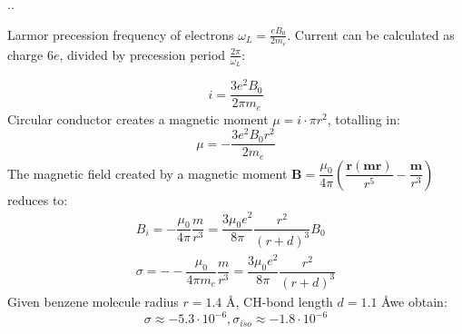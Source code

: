 \documentclass{beamer}
\begin{document}
\begin{frame}{\thesection.\thesubsection. \insertsubsection}
\begin{minipage}{0.3\textwidth}
			\end{minipage}
			\hspace{0.1cm}
			{\tiny
			\begin{minipage}{0.65\textwidth}
									Larmor precession frequency of electrons $\omega_L = \frac{e B_0}{2 m_e}$. Current can be calculated as charge $6 e$, divided by precession period $\frac{2 \pi}{\omega_L}$:
									\par
									\begin{equation}				    
									i = \dfrac{3e^2 B_0}{2 \pi m_e}
									\end{equation}
				  \onslide<3->
					Circular conductor creates a magnetic moment $\mu = i \cdot \pi r^2 $, totalling in:				
									\begin{equation}
									\mu = -\dfrac{3 e^2 B_0 r^2}{2 m_e}
									\end{equation}
				  \onslide<4->
									The magnetic field created by a magnetic moment  $\bm{B} = \dfrac{\mu_0}{4 \pi}(\dfrac{\bm{r(mr)}}{r^5} - \dfrac{\bm{m}}{r^3}  )$ reduces to:
									\begin{align}
									B_i = -\dfrac{\mu_0}{4 \pi}\dfrac{m}{r^3} = \dfrac{3 \mu_0 e^2}{8 \pi} \dfrac{r^2}{(r+d)^3} B_0 \\
									\sigma = --\dfrac{\mu_0}{4 \pi m_e}\dfrac{m}{r^3} = \dfrac{3 \mu_0 e^2}{8 \pi} \dfrac{r^2}{(r+d)^3}
									\end{align}
				  \onslide<5->
									Given benzene molecule radius $r=1.4$ \AA, CH-bond length $d = 1.1$ \AA we obtain:
									\begin{equation}
									\sigma \approx -5.3 \cdot 10^{-6}, \sigma_{iso} \approx -1.8 \cdot 10^{-6}
									\end{equation}

			\end{minipage}
			
		    }%

		
		

\end{frame}
\end{document}
